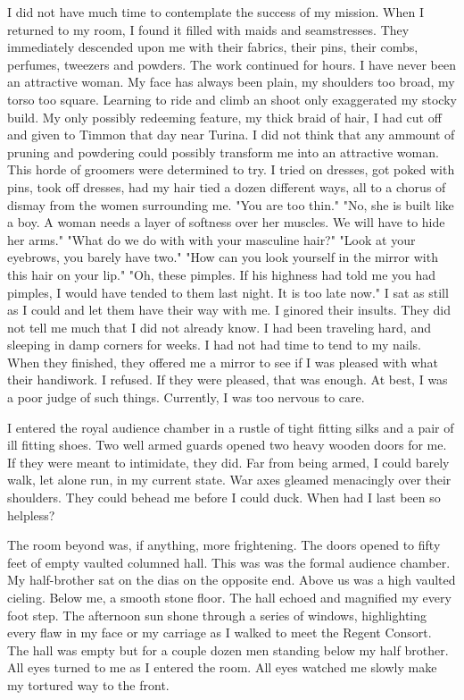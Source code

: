 \documentclass{article}
\begin{document}
I did not have much time to contemplate the success of my mission. When I returned to my room, I found it filled with maids and seamstresses. They immediately descended upon me with their fabrics, their pins, their combs, perfumes, tweezers and powders. The work continued for hours. I have never been an attractive woman. My face has always been plain, my shoulders too broad, my torso too square. Learning to ride and climb an shoot only exaggerated my stocky build. My only possibly redeeming feature, my thick braid of hair, I had cut off and given to Timmon that day near Turina. I did not think that any ammount of pruning and powdering could possibly transform me into an attractive woman. This horde of groomers were determined to try. I tried on dresses, got poked with pins, took off dresses, had my hair tied a dozen different ways, all to a chorus of dismay from the women surrounding me. "You are too thin." "No, she is built like a boy. A woman needs a layer of softness over her muscles. We will have to hide her arms." "What do we do with with your masculine hair?" "Look at your eyebrows, you barely have two." "How can you look yourself in the mirror with this hair on your lip." "Oh, these pimples. If his highness had told me you had pimples, I would have tended to them last night. It is too late now." I sat as still as I could and let them have their way with me. I ginored their insults. They did not tell me much that I did not already know. I had been traveling hard, and sleeping in damp corners for weeks. I had not had time to tend to my nails. When they finished, they offered me a mirror to see if I was pleased with what their handiwork. I refused. If they were pleased, that was enough. At best, I was a poor judge of such things. Currently, I was too nervous to care.

I entered the royal audience chamber in a rustle of tight fitting silks and a pair of ill fitting shoes. Two well armed guards opened two heavy wooden doors for me. If they were meant to intimidate, they did. Far from being armed, I could barely walk, let alone run, in my current state. War axes gleamed menacingly over their shoulders. They could behead me before I could duck. When had I last been so helpless? 

The room beyond was, if anything, more frightening. The doors opened to fifty feet of empty vaulted columned hall. This was was the formal audience chamber. My half-brother sat on the dias on the opposite end. Above us was a high vaulted cieling. Below me, a smooth stone floor. The hall echoed and magnified my every foot step. The afternoon sun shone through a series of windows, highlighting every flaw in my face or my carriage as I walked to meet the Regent Consort. The hall was empty but for a couple dozen men standing below my half brother. All eyes turned to me as I entered the room. All eyes watched me slowly make my tortured way to the front.
\end{document}
